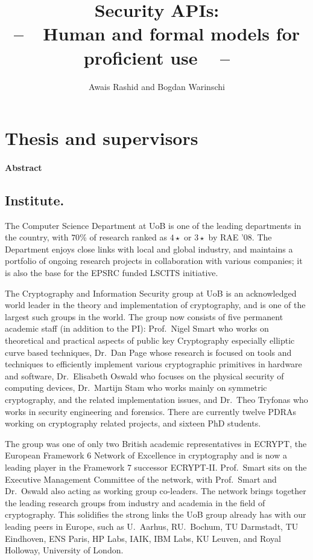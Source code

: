 \documentclass[10pt]{article}
\date{}
\title{\bf Security APIs:  \\
--{\large \ \ Human and formal models for proficient use  \ } --}
\author{Awais Rashid and Bogdan Warinschi}
\begin{document}
\maketitle
\section{Thesis and supervisors}


\paragraph*{Abstract}


\iffalse
\subsection*{Institute.}
The Computer Science Department at UoB is one of
the leading departments in the country, with $70$\% of research ranked as
$4\star$ or $3\star$ by RAE '08.
The Department enjoys close links with local and global industry, and maintains
a portfolio of ongoing research projects in collaboration with various
companies; it is also the base for the EPSRC funded LSCITS initiative.

The Cryptography and Information Security group at UoB is an acknowledged
world leader in the theory and implementation of cryptography, and is
one of the largest such groups in the world.
The group now consists of five permanent academic staff (in
addition to the PI): 
Prof.~Nigel Smart who works on theoretical and practical aspects of public key 
Cryptography especially elliptic curve based techniques, 
Dr.~Dan Page whose research is focused on tools and techniques to efficiently 
implement various cryptographic primitives in hardware and software, 
Dr.~Elisabeth Oswald who focuses on the physical security of computing devices, 
Dr.~Martijn Stam who works mainly on symmetric cryptography,  
and the related implementation issues, and 
Dr.~Theo Tryfonas who works in security engineering and forensics.
There are currently twelve PDRAs working on cryptography related projects, 
and sixteen PhD students.



The group was one of only two British academic representatives in ECRYPT, 
the European Framework 6 Network of Excellence in cryptography and is now a leading player in the Framework 7 successor  ECRYPT-II. 
Prof.~Smart sits on the Executive Management Committee of the network,
with Prof.~Smart and Dr.~Oswald also acting as working group co-leaders.
The network brings together the leading research groups from industry
and academia in the field of cryptography.
This solidifies the strong links the UoB group already has with our
leading peers in Europe, such as U.~Aarhus, RU.~Bochum, TU Darmstadt, TU Eindhoven, 
ENS Paris, HP Labs, IAIK, IBM Labs, KU Leuven, and Royal Holloway, University of London.
\end{document}
